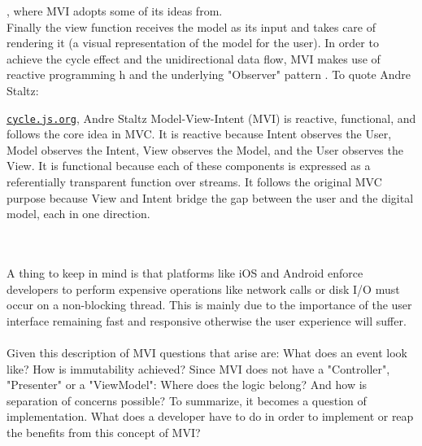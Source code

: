 \cite{functionalProgrammingWikiHaskell,functionalProgrammingPractical,programmingInHaskellFunctionalProgrammingDefinition},
where MVI adopts some of its ideas from.
\\
Finally the view function receives the model as its input and takes care of rendering it (a visual representation of the model for the user). 
In order to achieve the cycle effect and the unidirectional data flow, MVI makes use of reactive programming 
h\cite{reactiveProgrammingIntroAndreStaltz} and the underlying "Observer" pattern \cite{wikipediaObserverPattern}.
To quote Andre Staltz:
\begin{pquotation}{\href{https://cycle.js.org/model-view-intent.html#model-view-intent-what-mvc-is-really-about}{\nolinkurl{cycle.js.org}}, Andre Staltz}
    Model-View-Intent (MVI) is reactive, functional, and follows the core idea in MVC. It is reactive because Intent observes the User, Model observes the Intent, 
    View observes the Model, and the User observes the View. It is functional because each of these components is expressed as a referentially transparent function 
    over streams. It follows the original MVC purpose because View and Intent bridge the gap between the user and the digital model, each in one direction.
\end{pquotation}
\\
\\
A thing to keep in mind is that platforms like iOS and Android enforce developers to perform expensive operations like network calls or disk I/O must occur on a 
non-blocking thread. This is mainly due to the importance of the user interface remaining fast and responsive otherwise the user experience will suffer.
\\
\\
Given this description of MVI questions that arise are: What does an event look like? How is immutability achieved?
Since MVI does not have a "Controller", "Presenter" or a "ViewModel": Where does the logic belong? And how is separation of concerns possible?
To summarize, it becomes a question of implementation. What does a developer have to do in order to implement or reap the benefits from this concept of MVI?